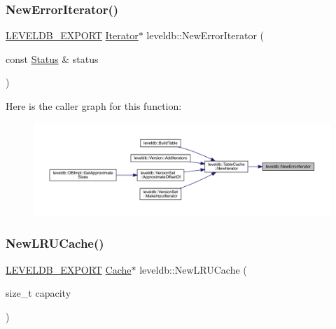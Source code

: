 \mbox{\label{namespaceleveldb_a192c5c146be88c57010621727cb27e2c}} 
\subsubsection{\texorpdfstring{NewErrorIterator()}{NewErrorIterator()}}
{\footnotesize\ttfamily \mbox{\hyperlink{export_8h_a658cd25b9dd114d894ae8ce9dddb7d3a}{L\+E\+V\+E\+L\+D\+B\+\_\+\+E\+X\+P\+O\+RT}} \mbox{\hyperlink{classleveldb_1_1_iterator}{Iterator}}$\ast$ leveldb\+::\+New\+Error\+Iterator (\begin{DoxyParamCaption}\item[{const \mbox{\hyperlink{classleveldb_1_1_status}{Status}} \&}]{status }\end{DoxyParamCaption})}

Here is the caller graph for this function\+:
\nopagebreak
\begin{figure}[H]
\begin{center}
\leavevmode
\includegraphics[width=350pt]{namespaceleveldb_a192c5c146be88c57010621727cb27e2c_icgraph}
\end{center}
\end{figure}
\mbox{\label{namespaceleveldb_a05f8130d07c05f6ffab639fe4da0e9e8}} 
\subsubsection{\texorpdfstring{NewLRUCache()}{NewLRUCache()}}
{\footnotesize\ttfamily \mbox{\hyperlink{export_8h_a658cd25b9dd114d894ae8ce9dddb7d3a}{L\+E\+V\+E\+L\+D\+B\+\_\+\+E\+X\+P\+O\+RT}} \mbox{\hyperlink{classleveldb_1_1_cache}{Cache}}$\ast$ leveldb\+::\+New\+L\+R\+U\+Cache (\begin{DoxyParamCaption}\item[{size\+\_\+t}]{capacity }\end{DoxyParamCaption})}

